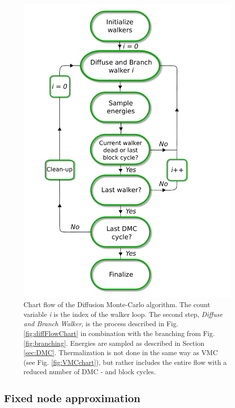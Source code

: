 \begin{figure}[ht]
 \begin{center}
  \includegraphics[scale=0.65]{../Graphics/DMCUML.pdf}
  \caption{Chart flow of the Diffusion Monte-Carlo algorithm. The count variable \textit{i} is the index of the walker loop. The second step, \textit{Diffuse and Branch Walker}, is the process described in Fig. \ref{fig:diffFlowChart} in combination with the branching from Fig. \ref{fig:branching}. Energies are sampled as described in Section \ref{sec:DMC}. Thermalization is not done in the same way as VMC (see Fig. \ref{fig:VMCchart}), but rather includes the entire flow with a reduced number of DMC - and block cycles.}
  \label{fig:DMCchart}
 \end{center}
\end{figure}
\clearpage

\subsection{Fixed node approximation}

